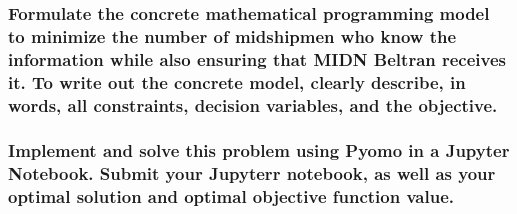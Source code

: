 \documentclass[11pt]{article}
\theoremstyle{definition}
\begin{document}
\subsubsection{Formulate the concrete mathematical programming model to minimize the number of midshipmen who know the information while also ensuring that MIDN Beltran receives it. To write out the concrete model, clearly describe, in words, all constraints, decision variables, and the objective.}
\vfill

\subsubsection{Implement and solve this problem using Pyomo in a Jupyter Notebook. Submit your Jupyterr notebook, as well as your optimal solution and optimal objective function value.}
\end{document}
